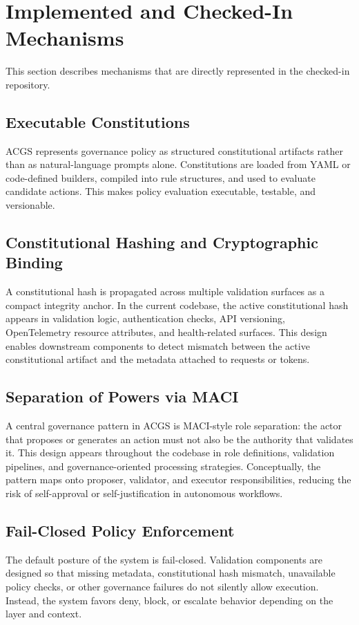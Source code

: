 \documentclass[11pt]{article}
\begin{document}
\section{Implemented and Checked-In Mechanisms}
This section describes mechanisms that are directly represented in the checked-in repository.

\subsection{Executable Constitutions}
ACGS represents governance policy as structured constitutional artifacts rather than as natural-language prompts alone. Constitutions are loaded from YAML or code-defined builders, compiled into rule structures, and used to evaluate candidate actions. This makes policy evaluation executable, testable, and versionable.

\subsection{Constitutional Hashing and Cryptographic Binding}
A constitutional hash is propagated across multiple validation surfaces as a compact integrity anchor. In the current codebase, the active constitutional hash appears in validation logic, authentication checks, API versioning, OpenTelemetry resource attributes, and health-related surfaces. This design enables downstream components to detect mismatch between the active constitutional artifact and the metadata attached to requests or tokens.

\subsection{Separation of Powers via MACI}
A central governance pattern in ACGS is MACI-style role separation: the actor that proposes or generates an action must not also be the authority that validates it. This design appears throughout the codebase in role definitions, validation pipelines, and governance-oriented processing strategies. Conceptually, the pattern maps onto proposer, validator, and executor responsibilities, reducing the risk of self-approval or self-justification in autonomous workflows.

\subsection{Fail-Closed Policy Enforcement}
The default posture of the system is fail-closed. Validation components are designed so that missing metadata, constitutional hash mismatch, unavailable policy checks, or other governance failures do not silently allow execution. Instead, the system favors deny, block, or escalate behavior depending on the layer and context.
\end{document}
